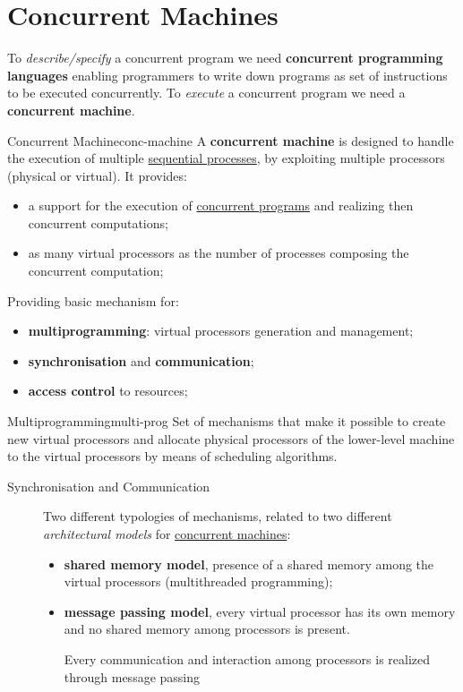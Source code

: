 \section{Concurrent Machines}\label{sec:cp_concurrent_machines} %
To \textit{describe/specify} a concurrent program we need \textbf{concurrent programming languages} enabling programmers to write down programs as set of instructions to be executed concurrently.
\emptyln{}
To \textit{execute} a concurrent program we need a \textbf{concurrent machine}.
\begin{definition}{Concurrent Machine}{conc-machine}
    A \textbf{concurrent machine} is designed to handle the execution of multiple \hyperref[def:seq-process]{sequential processes}, by exploiting multiple processors (physical or virtual).
    \emptyln{}
    It provides:
    \begin{itemize}
        \item a support for the execution of \hyperref[def:conc-prog]{concurrent programs} and realizing then concurrent computations;
        \item as many virtual processors as the number of processes composing the concurrent computation; 
    \end{itemize}
    Providing basic mechanism for:
    \begin{itemize}
        \item \textbf{multiprogramming}: virtual processors generation and management;
        \item \textbf{synchronisation} and \textbf{communication};
        \item \textbf{access control} to resources;
    \end{itemize}
\end{definition}
\begin{definition}{Multiprogramming}{multi-prog}
    Set of mechanisms that make it possible to create new virtual processors and allocate physical processors of the lower-level machine to the virtual processors by means of scheduling algorithms.
\end{definition}
\begin{description}
    \item[Synchronisation and Communication] Two different typologies of mechanisms, related to two different \textit{architectural models} for \hyperref[def:conc-machine]{concurrent machines}:
        \begin{itemize}
            \item \textbf{shared memory model}, presence of a shared memory among the virtual processors (multithreaded programming);
            \item \textbf{message passing model}, every virtual processor has its own memory and no shared memory among processors is present.
                \begin{note}
                    Every communication and interaction among processors is realized through message passing
                \end{note}
        \end{itemize}
\end{description}
%
